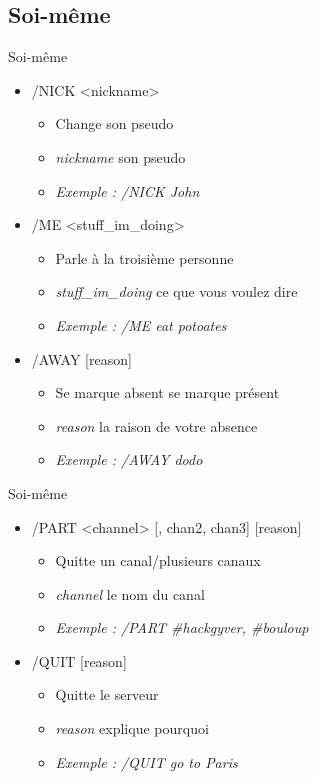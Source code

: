\documentclass{beamer}
\begin{document}
	\subsection{Soi-même} %
	
\begin{frame}{Soi-même}
\begin{itemize}	
	\itemsep1.3em
		\item /NICK <nickname>
		\begin{itemize}
			\item Change son pseudo
			\item \textit{nickname} son pseudo
			\item \textit{Exemple : /NICK John}
		\end{itemize}
		\item /ME <stuff\_im\_doing>
		\begin{itemize}
			\item Parle à la troisième personne
			\item \textit{stuff\_im\_doing} ce que vous voulez dire
			\item \textit{Exemple : /ME eat potoates}
		\end{itemize}
		\item /AWAY [reason]
		\begin{itemize}
			\item Se marque absent se marque présent
			\item \textit{reason} la raison de votre absence
			\item \textit{Exemple : /AWAY dodo}
		\end{itemize}
\end{itemize}
\end{frame}

\begin{frame}{Soi-même}
\begin{itemize}	
	\itemsep1.3em
		\item /PART <channel> [, chan2, chan3] [reason]
		\begin{itemize}
			\item Quitte un canal/plusieurs canaux
			\item \textit{channel} le nom du canal
			\item \textit{Exemple : /PART \#hackgyver, \#bouloup}
		\end{itemize}
		\item /QUIT [reason]
		\begin{itemize}
			\item Quitte le serveur
			\item \textit{reason} explique pourquoi
			\item \textit{Exemple : /QUIT go to Paris}
		\end{itemize}
\end{itemize}
\end{frame}
	
\end{document}
